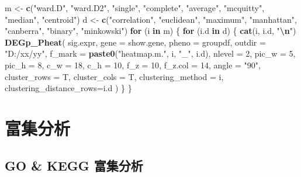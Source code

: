 \documentclass[
]{book}
\newenvironment{Shaded}{\begin{snugshade}}{\end{snugshade}}
\newcommand{\AttributeTok}[1]{\textcolor[rgb]{0.13,0.29,0.53}{#1}}
\newcommand{\ControlFlowTok}[1]{\textcolor[rgb]{0.13,0.29,0.53}{\textbf{#1}}}
\newcommand{\DecValTok}[1]{\textcolor[rgb]{0.00,0.00,0.81}{#1}}
\newcommand{\FunctionTok}[1]{\textcolor[rgb]{0.13,0.29,0.53}{\textbf{#1}}}
\newcommand{\NormalTok}[1]{#1}
\newcommand{\OtherTok}[1]{\textcolor[rgb]{0.56,0.35,0.01}{#1}}
\newcommand{\SpecialCharTok}[1]{\textcolor[rgb]{0.81,0.36,0.00}{\textbf{#1}}}
\newcommand{\StringTok}[1]{\textcolor[rgb]{0.31,0.60,0.02}{#1}}
\begin{document}
\begin{Shaded}
\begin{Highlighting}[]
\NormalTok{m }\OtherTok{\textless{}{-}} \FunctionTok{c}\NormalTok{(}\StringTok{"ward.D"}\NormalTok{, }\StringTok{"ward.D2"}\NormalTok{, }\StringTok{"single"}\NormalTok{, }\StringTok{"complete"}\NormalTok{, }
\StringTok{"average"}\NormalTok{, }\StringTok{"mcquitty"}\NormalTok{, }
\StringTok{"median"}\NormalTok{, }\StringTok{"centroid"}\NormalTok{)}
\NormalTok{d }\OtherTok{\textless{}{-}} \FunctionTok{c}\NormalTok{(}\StringTok{"correlation"}\NormalTok{, }\StringTok{"euclidean"}\NormalTok{, }\StringTok{"maximum"}\NormalTok{, }\StringTok{"manhattan"}\NormalTok{,}
       \StringTok{"canberra"}\NormalTok{, }\StringTok{"binary"}\NormalTok{, }\StringTok{"minkowski"}\NormalTok{)}
\ControlFlowTok{for}\NormalTok{ (i }\ControlFlowTok{in}\NormalTok{ m) \{}
  \ControlFlowTok{for}\NormalTok{ (i.d }\ControlFlowTok{in}\NormalTok{ d) \{}
    \FunctionTok{cat}\NormalTok{(i, i.d, }\StringTok{"}\SpecialCharTok{\textbackslash{}n}\StringTok{"}\NormalTok{)}
    \FunctionTok{DEGp\_Pheat}\NormalTok{(}
\NormalTok{      sig.expr,}
      \AttributeTok{gene =}\NormalTok{ show.gene, }
      \AttributeTok{pheno =}\NormalTok{ groupdf,}
      \AttributeTok{outdir =} \StringTok{"D:/xx/yy"}\NormalTok{,}
      \AttributeTok{f\_mark =} \FunctionTok{paste0}\NormalTok{(}\StringTok{"heatmap.m."}\NormalTok{, i, }\StringTok{"\_"}\NormalTok{, i.d),}
      \AttributeTok{nlevel =} \DecValTok{2}\NormalTok{,}
      \AttributeTok{pic\_w =} \DecValTok{5}\NormalTok{,}
      \AttributeTok{pic\_h =} \DecValTok{8}\NormalTok{,}
      \AttributeTok{c\_w =} \DecValTok{18}\NormalTok{,}
      \AttributeTok{c\_h =} \DecValTok{10}\NormalTok{,}
      \AttributeTok{f\_z =} \DecValTok{10}\NormalTok{,}
      \AttributeTok{f\_z.col =} \DecValTok{14}\NormalTok{,}
      \AttributeTok{angle =} \StringTok{"90"}\NormalTok{,}
      \AttributeTok{cluster\_rows =}\NormalTok{ T,}
      \AttributeTok{cluster\_cols =}\NormalTok{ T,}
      \AttributeTok{clustering\_method =}\NormalTok{ i,}
      \AttributeTok{clustering\_distance\_rows=}\NormalTok{i.d}
\NormalTok{    )  }
\NormalTok{  \}}
\NormalTok{\}}
\end{Highlighting}
\end{Shaded}

\section{富集分析}\label{enrich}

\subsection{GO \& KEGG 富集分析}\label{enrich-auto}
\end{document}
